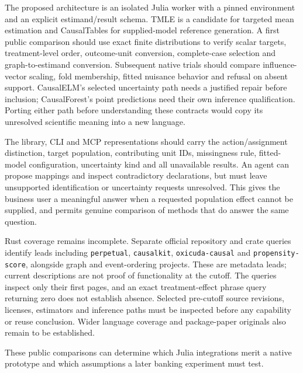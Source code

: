The proposed architecture is an isolated Julia worker with a pinned
environment and an explicit estimand/result schema. TMLE is a candidate for
targeted mean estimation and CausalTables for supplied-model reference
generation. A first public comparison should use exact finite distributions
to verify scalar targets, treatment-level order, outcome-unit conversion,
complete-case selection and graph-to-estimand conversion. Subsequent native
trials should compare influence-vector scaling, fold membership, fitted
nuisance behavior and refusal on absent support. CausalELM's selected
uncertainty path needs a justified repair before inclusion; CausalForest's
point predictions need their own inference qualification. Porting either
path before understanding these contracts would copy its unresolved
scientific meaning into a new language.

The library, CLI and MCP representations should carry the action/assignment
distinction, target population, contributing unit IDs, missingness rule,
fitted-model configuration, uncertainty kind and all unavailable results.
An agent can propose mappings and inspect contradictory declarations, but
must leave unsupported identification or uncertainty requests unresolved.
This gives the business user a meaningful answer when a requested population
effect cannot be supplied, and permits genuine comparison of methods that
do answer the same question.

Rust coverage remains incomplete. Separate official repository and crate
queries identify leads including \texttt{perpetual}, \texttt{causalkit},
\texttt{oxicuda-causal} and \texttt{propensity-score}, alongside graph and
event-ordering projects. These are metadata leads; current descriptions are
not proof of functionality at the cutoff. The queries inspect only their
first pages, and an exact treatment-effect phrase query returning zero does
not establish absence. Selected pre-cutoff source revisions, licenses,
estimators and inference paths must be inspected before any capability or
reuse conclusion. Wider language coverage and package-paper originals also
remain to be established. \cite{exec21_effects_discovery}

These public comparisons can determine which Julia integrations merit a
native prototype and which assumptions a later banking experiment must test.
